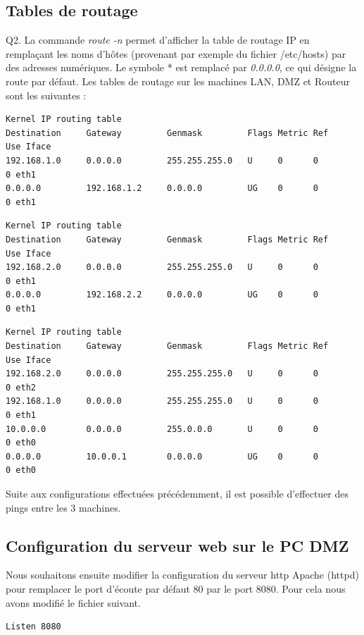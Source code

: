 \documentclass[frenchb, 11pt]{article}
\newlength{\leftbarwidth}
\newlength{\leftbarsep}
\newcommand*{\leftbarcolorcmd}{\color{leftbarcolor}} %
\renewenvironment{leftbar}{%
    \def\FrameCommand{{\leftbarcolorcmd{\vrule width \leftbarwidth\relax\hspace {\leftbarsep}}}}%
    \MakeFramed {\advance \hsize -\width \FrameRestore }%
}{%
    \endMakeFramed
}
\begin{document}
\subsection{Tables de routage}
\begin{leftbar}
	\noindent Q2. La commande \emph{route -n} permet d'afficher la table de routage IP en remplaçant les noms d'hôtes (provenant par exemple du fichier /etc/hosts) par des adresses numériques. Le symbole * est remplacé par \emph{0.0.0.0}, ce qui désigne la route par défaut. Les tables de routage sur les machines LAN, DMZ et Routeur sont les suivantes :
	\begin{lstlisting}[caption=Table de routage LAN, numbers=none]
Kernel IP routing table
Destination     Gateway         Genmask         Flags Metric Ref    Use Iface
192.168.1.0     0.0.0.0         255.255.255.0   U     0      0        0 eth1
0.0.0.0         192.168.1.2     0.0.0.0         UG    0      0        0 eth1
	\end{lstlisting}
	\begin{lstlisting}[caption=Table de routage DMZ, numbers=none]
Kernel IP routing table
Destination     Gateway         Genmask         Flags Metric Ref    Use Iface
192.168.2.0     0.0.0.0         255.255.255.0   U     0      0        0 eth1
0.0.0.0         192.168.2.2     0.0.0.0         UG    0      0        0 eth1
	\end{lstlisting}
	\begin{lstlisting}[caption=Table de routage Routeur, numbers=none]
Kernel IP routing table
Destination     Gateway         Genmask         Flags Metric Ref    Use Iface
192.168.2.0     0.0.0.0         255.255.255.0   U     0      0        0 eth2
192.168.1.0     0.0.0.0         255.255.255.0   U     0      0        0 eth1
10.0.0.0        0.0.0.0         255.0.0.0       U     0      0        0 eth0
0.0.0.0         10.0.0.1        0.0.0.0         UG    0      0        0 eth0
	\end{lstlisting}
\end{leftbar}

\noindent Suite aux configurations effectuées précédemment, il est possible d'effectuer des pings entre les 3 machines.

\subsection{Configuration du serveur web sur le PC DMZ}
Nous souhaitons ensuite modifier la configuration du serveur http Apache (httpd) pour remplacer le port d'écoute par défaut 80 par le port 8080. Pour cela nous avons modifié le fichier suivant.
\begin{lstlisting}[caption=/etc/httpd/conf/httpd.conf]
Listen 8080
\end{lstlisting}
\hfill
\end{document}
